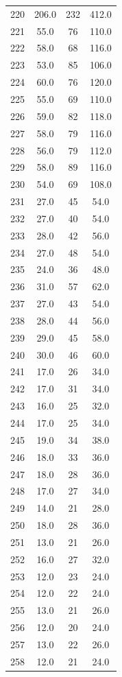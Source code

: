 \documentclass[12pt, a4paper]{report}
\begin{document}
\begin{longtable}{| c | c | c | c |}
  220 & 206.0 & 232 & 412.0 \\
  221 & 55.0 & 76 & 110.0 \\
  222 & 58.0 & 68 & 116.0 \\
  223 & 53.0 & 85 & 106.0 \\
  224 & 60.0 & 76 & 120.0 \\
  225 & 55.0 & 69 & 110.0 \\
  226 & 59.0 & 82 & 118.0 \\
  227 & 58.0 & 79 & 116.0 \\
  228 & 56.0 & 79 & 112.0 \\
  229 & 58.0 & 89 & 116.0 \\
  230 & 54.0 & 69 & 108.0 \\
  231 & 27.0 & 45 & 54.0 \\
  232 & 27.0 & 40 & 54.0 \\
  233 & 28.0 & 42 & 56.0 \\
  234 & 27.0 & 48 & 54.0 \\
  235 & 24.0 & 36 & 48.0 \\
  236 & 31.0 & 57 & 62.0 \\
  237 & 27.0 & 43 & 54.0 \\
  238 & 28.0 & 44 & 56.0 \\
  239 & 29.0 & 45 & 58.0 \\
  240 & 30.0 & 46 & 60.0 \\
  241 & 17.0 & 26 & 34.0 \\
  242 & 17.0 & 31 & 34.0 \\
  243 & 16.0 & 25 & 32.0 \\
  244 & 17.0 & 25 & 34.0 \\
  245 & 19.0 & 34 & 38.0 \\
  246 & 18.0 & 33 & 36.0 \\
  247 & 18.0 & 28 & 36.0 \\
  248 & 17.0 & 27 & 34.0 \\
  249 & 14.0 & 21 & 28.0 \\
  250 & 18.0 & 28 & 36.0 \\
  251 & 13.0 & 21 & 26.0 \\
  252 & 16.0 & 27 & 32.0 \\
  253 & 12.0 & 23 & 24.0 \\
  254 & 12.0 & 22 & 24.0 \\
  255 & 13.0 & 21 & 26.0 \\
  256 & 12.0 & 20 & 24.0 \\
  257 & 13.0 & 22 & 26.0 \\
  258 & 12.0 & 21 & 24.0 \\

\end{longtable}
\end{document}
